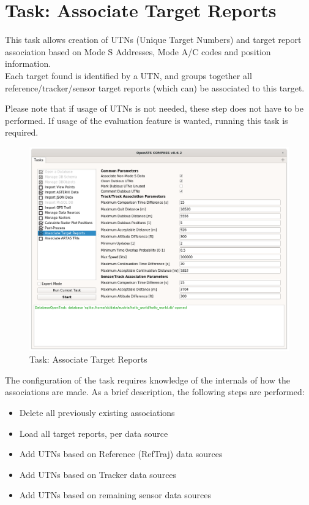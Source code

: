 \section{Task: Associate Target Reports}
\label{sec:task_associate_tr} 

This task allows creation of UTNs (Unique Target Numbers) and target report association based on Mode S Addresses, Mode A/C codes and position information. \\

Each target found is identified by a UTN, and groups together all reference/tracker/sensor target reports (which can) be associated to this target.

Please note that if usage of UTNs is not needed, these step does not have to be performed. If usage of the evaluation feature is wanted, running this task is required. \\

\begin{figure}[H]
  \hspace*{-2.5cm}
    \includegraphics[width=19cm]{../screenshots/tr_association_config.png}
  \caption{Task: Associate Target Reports}
\end{figure}

The configuration of the task requires knowledge of the internals of how the associations are made. As a brief description, the following steps are performed:

\begin{itemize}
\item Delete all previously existing associations
\item Load all target reports, per data source
\item Add UTNs based on Reference (RefTraj) data sources
\item Add UTNs based on Tracker data sources
\item Add UTNs based on remaining sensor data sources
\end{itemize}
\ \\

